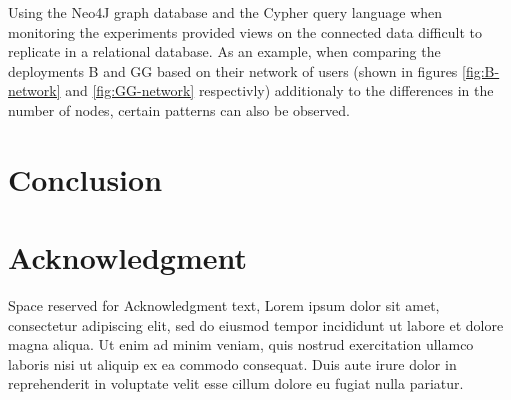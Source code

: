 \documentclass[conference]{IEEEtran}
\begin{document}
Using the Neo4J graph database and the Cypher query language when monitoring the experiments provided 
views on the connected data difficult to replicate in a relational database. As an example, when comparing the
deployments B and GG based on their network of users (shown in figures \ref{fig:B-network} and \ref{fig:GG-network}
respectivly) additionaly to the differences in the number of nodes, certain patterns can also be observed.

\section{Conclusion}
\label{sec:conclusions}


\section*{Acknowledgment}
Space reserved for Acknowledgment text, Lorem ipsum dolor sit amet, consectetur adipiscing elit,
sed do eiusmod tempor incididunt ut labore et dolore magna aliqua. Ut enim ad minim veniam, quis 
nostrud exercitation ullamco laboris nisi ut aliquip ex ea commodo consequat. Duis aute irure dolor
in reprehenderit in voluptate velit esse cillum dolore eu fugiat nulla pariatur. 







%
%
%


\end{document}
